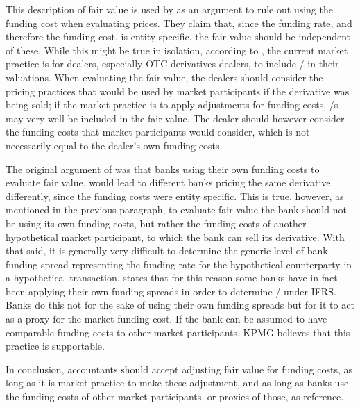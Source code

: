 \documentclass[main.tex]{subfiles}
\begin{document}
            This description of fair value is used by \textcite{HullWhiteFVA} as an argument to
            rule out using the funding cost when evaluating prices.
            They claim that, since the funding rate, and therefore the funding cost, is entity specific,
            the fair value should be independent of these.
            While this might be true in isolation, 
            according to \textcite{KPMGFVA}, the current market practice is for dealers, 
            especially OTC derivatives dealers, to include \FVA/ in their valuations.  
            When evaluating the fair value, the dealers should consider the pricing practices 
            that would be used by market participants if the derivative was being sold;
            if the market practice is to apply adjustments for funding costs,
            \FVA/s may very well be included in the fair value.
            The dealer should however consider the funding costs that market participants would consider,
            which is not necessarily equal to the dealer's own funding costs.

            The original argument of \textcite{HullWhiteFVA} was that banks using their own funding costs to evaluate fair value,
            would lead to different banks pricing the same derivative differently,
            since the funding costs were entity specific.
            This is true, however, as mentioned in the previous paragraph,
            to evaluate fair value the bank should not be using its own funding costs, 
            but rather the funding costs of another hypothetical market participant, 
            to which the bank can sell its derivative.
            With that said, it is generally very difficult to determine the generic level of bank funding spread
            representing the funding rate for the hypothetical counterparty in a hypothetical transaction.
            \textcite[Proposition 4]{KPMGFVA} states that for this reason 
            some banks have in fact been applying their own funding spreads in order to determine \FVA/ under IFRS. 
            Banks do this not for the sake of using their own funding spreads
            but for it to act as a proxy for the market funding cost.
            If the bank can be assumed to have comparable funding costs to other market participants,
            KPMG believes that this practice is supportable.

            In conclusion, accountants should accept adjusting fair value for funding costs,
            as long as it is market practice to make these adjustment,
            and as long as banks use the funding costs of other market participants, 
            or proxies of those, as reference.
\end{document}
